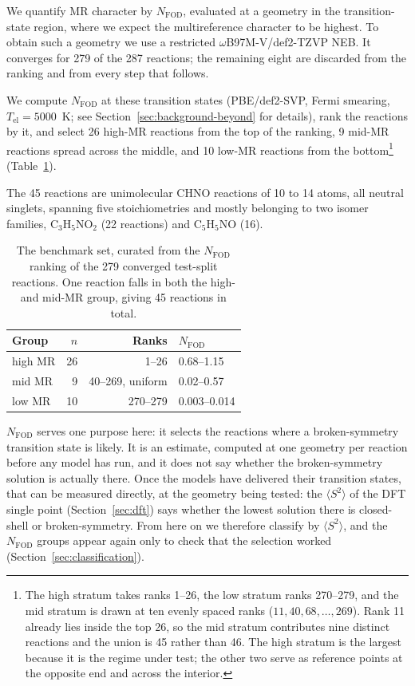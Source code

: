 We quantify MR character by $N_\mathrm{FOD}$, evaluated at a geometry in the
transition-state region, where we expect the multireference character to be
highest. To obtain such a geometry we use a restricted
\mbox{$\omega$B97M-V/def2-TZVP} NEB. It converges for 279 of the 287
reactions; the remaining eight are discarded from the ranking and
from every step that follows.

We compute $N_\mathrm{FOD}$ at these transition states (PBE/def2-SVP, Fermi
smearing, $T_\mathrm{el} = 5000$~K; see
Section~\ref{sec:background-beyond} for details), rank the reactions by
it, and select 26 high-MR reactions from the top of the ranking, 9 mid-MR
reactions spread across the middle, and 10 low-MR reactions from the
bottom\footnote{The high stratum takes ranks 1--26, the low stratum ranks
270--279, and the mid stratum is drawn at ten evenly spaced ranks
($11, 40, 68, \dots, 269$). Rank 11 already lies inside the top 26, so the mid
stratum contributes nine distinct reactions and the union is 45 rather than 46.
The high stratum is the largest because it is the regime under test; the other
two serve as reference points at the opposite end and across the interior.}
(Table~\ref{tab:strata}).

The 45 reactions are unimolecular CHNO reactions of 10 to 14 atoms, all neutral
singlets, spanning five stoichiometries and mostly belonging to two isomer
families, C$_3$H$_5$NO$_2$ (22 reactions) and C$_5$H$_5$NO (16).


\begin{table}[h]
\caption{The benchmark set, curated from the $N_\mathrm{FOD}$ ranking of
the 279 converged test-split reactions. One reaction falls in both the
high- and mid-MR group, giving 45 reactions in total.}
\label{tab:strata}
\centering
\begin{tabular}{lrrl}
\toprule
Group & $n$ & Ranks & $N_\mathrm{FOD}$ \\
\midrule
high MR & 26 & 1--26            & 0.68--1.15 \\
mid MR  &  9 & 40--269, uniform & 0.02--0.57 \\
low MR  & 10 & 270--279         & 0.003--0.014 \\
\bottomrule
\end{tabular}
\end{table}

$N_\mathrm{FOD}$ serves one purpose here: it selects the reactions
where a broken-symmetry transition state is likely. It is an estimate,
computed at one geometry per reaction before any model has run, and
it does not say whether the broken-symmetry solution is actually
there. Once the models have delivered their transition states, that
can be measured directly, at the geometry being tested: the
$\langle S^2\rangle$ of the DFT single point (Section~\ref{sec:dft})
says whether the lowest solution there is closed-shell or
broken-symmetry. From here on we therefore classify by
$\langle S^2\rangle$, and the $N_\mathrm{FOD}$ groups appear again
only to check that the selection worked
(Section~\ref{sec:classification}).


